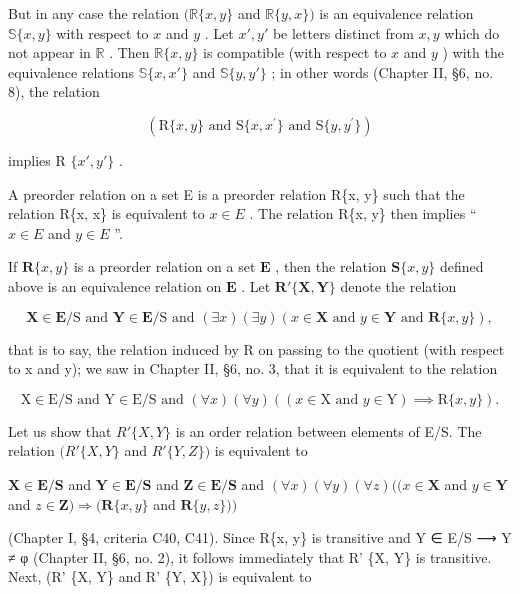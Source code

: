 But in any case the relation \((\mathbb{R}\{x, y\}\) and \(\mathbb{R}\{y, x\})\) is an equivalence relation \(\mathbb{S}\{x, y\}\) with respect to \(x\) and \(y\) . Let \(x', y'\) be letters distinct from \(x, y\) which do not appear in \(\mathbb{R}\) . Then \(\mathbb{R}\{x, y\}\) is compatible (with respect to \(x\) and \(y\) ) with the equivalence relations \(\mathbb{S}\{x, x'\}\) and \(\mathbb{S}\{y, y'\}\) ; in other words (Chapter II, §6, no. 8), the relation

\[
(\mathrm{R} \{x, y \} \text {   and   } \mathrm{S} \{x, x ^ {\prime} \} \text {   and   } \mathrm{S} \{y, y ^ {\prime} \})
\]

implies R \(\{x', y'\}\) .

A preorder relation on a set E is a preorder relation R\{x, y\} such that the relation R\{x, x\} is equivalent to \(x \in E\) . The relation R\{x, y\} then implies `` \(x \in E\) and \(y \in E\) ''.

If \(\mathbf{R}\{x, y\}\) is a preorder relation on a set \(\mathbf{E}\) , then the relation \(\mathbf{S}\{x, y\}\) defined above is an equivalence relation on \(\mathbf{E}\) . Let \(\mathbf{R}'\{\mathbf{X}, \mathbf{Y}\}\) denote the relation

\[
\mathbf {X} \in \mathbf {E} / \mathrm{S} \text { and } \mathbf {Y} \in \mathbf {E} / \mathrm{S} \text { and } (\exists x) (\exists y) (x \in \mathbf {X} \text { and } y \in \mathbf {Y} \text { and } \mathbf {R} \{x, y \}),
\]

that is to say, the relation induced by R on passing to the quotient (with respect to x and y); we saw in Chapter II, §6, no. 3, that it is equivalent to the relation

\[
\mathrm{X} \in \mathrm{E} / \mathrm{S} \text {   and   } \mathrm{Y} \in \mathrm{E} / \mathrm{S} \text {   and   } (\forall x) (\forall y) ((x \in \mathrm{X} \text {   and   } y \in \mathrm{Y}) \implies \mathrm{R} \{x, y \}).
\]

Let us show that \(R'\{X, Y\}\) is an order relation between elements of E/S. The relation \((R'\{X, Y\}\) and \(R'\{Y, Z\})\) is equivalent to

\(\mathbf{X} \in \mathbf{E} / \mathbf{S}\) and \(\mathbf{Y} \in \mathbf{E} / \mathbf{S}\) and \(\mathbf{Z} \in \mathbf{E} / \mathbf{S}\) and \((\forall x)(\forall y)(\forall z)((x \in \mathbf{X}\) and \(y \in \mathbf{Y}\) and \(z \in \mathbf{Z}) \Longrightarrow (\mathbf{R}\{x, y\}\) and \(\mathbf{R}\{y, z\}))\)

(Chapter I, §4, criteria C40, C41). Since R\{x, y\} is transitive and Y ∈ E/S ⟶ Y ≠ φ (Chapter II, §6, no. 2), it follows immediately that R' \{X, Y\} is transitive. Next, (R' \{X, Y\} and R' \{Y, X\}) is equivalent to

